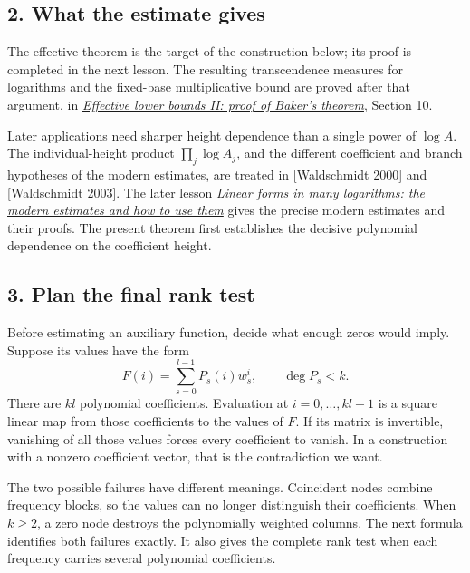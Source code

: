 \documentclass[
  11pt,
  a4paper,
]{article}
\begin{document}
\subsection{2. What the estimate gives}\label{what-the-estimate-gives}

The effective theorem is the target of the construction below; its proof
is completed in the next lesson. The resulting transcendence measures
for logarithms and the fixed-base multiplicative bound are proved after
that argument, in
\href{https://kokunoyumeto.github.io/open-math-courses-public/courses/TR-BAKER/TR-BAKER-05.html\#10-consequences-and-later-refinements}{\emph{Effective
lower bounds II: proof of Baker's theorem}}, Section 10.

Later applications need sharper height dependence than a single power of
\(\log A\). The individual-height product \(\prod_j\log A_j\), and the
different coefficient and branch hypotheses of the modern estimates, are
treated in {[}Waldschmidt 2000{]} and {[}Waldschmidt 2003{]}. The later
lesson \href{https://kokunoyumeto.github.io/open-math-courses-public/courses/TR-BAKER/TR-BAKER-08.html}{\emph{Linear forms in many logarithms:
the modern estimates and how to use them}} gives the precise modern
estimates and their proofs. The present theorem first establishes the
decisive polynomial dependence on the coefficient height.

\subsection{3. Plan the final rank test}\label{plan-the-final-rank-test}

Before estimating an auxiliary function, decide what enough zeros would
imply. Suppose its values have the form \[
F(i)=\sum_{s=0}^{l-1}P_s(i)w_s^i,\qquad \deg P_s<k.
\] There are \(kl\) polynomial coefficients. Evaluation at
\(i=0,\ldots,kl-1\) is a square linear map from those coefficients to
the values of \(F\). If its matrix is invertible, vanishing of all those
values forces every coefficient to vanish. In a construction with a
nonzero coefficient vector, that is the contradiction we want.

The two possible failures have different meanings. Coincident nodes
combine frequency blocks, so the values can no longer distinguish their
coefficients. When \(k\ge2\), a zero node destroys the polynomially
weighted columns. The next formula identifies both failures exactly. It
also gives the complete rank test when each frequency carries several
polynomial coefficients.
\end{document}
